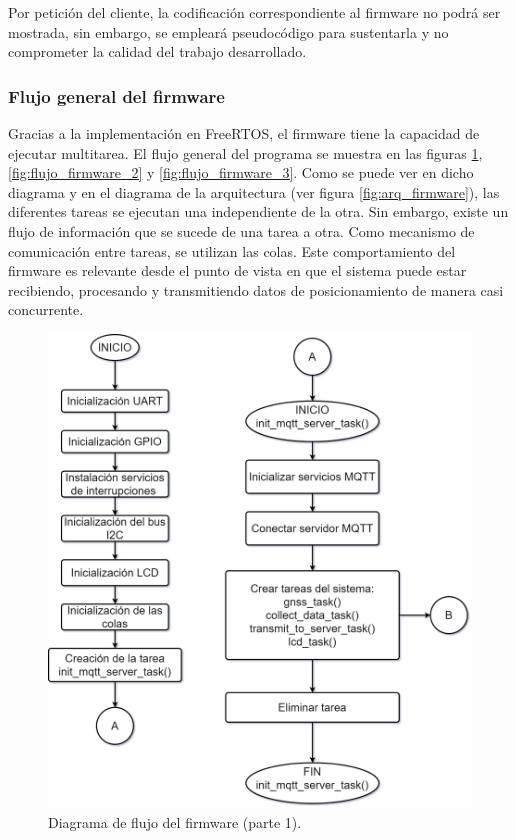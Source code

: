 Por petición del cliente, la codificación correspondiente al firmware no podrá ser mostrada, sin embargo, se empleará pseudocódigo para sustentarla y no comprometer la calidad del trabajo desarrollado. 

\subsubsection{Flujo general del firmware}

Gracias a la implementación en FreeRTOS, el firmware tiene la capacidad de ejecutar multitarea. El flujo general del programa se muestra en las figuras \ref{fig:flujo_firmware_1}, \ref{fig:flujo_firmware_2} y \ref{fig:flujo_firmware_3}. Como se puede ver en dicho diagrama y en el diagrama de la arquitectura (ver figura \ref{fig:arq_firmware}), las diferentes tareas se ejecutan una independiente de la otra. Sin embargo, existe un flujo de información que se sucede de una tarea a otra. Como mecanismo de comunicación entre tareas, se utilizan las colas. Este comportamiento del firmware es relevante desde el punto de vista en que el sistema puede estar recibiendo, procesando y transmitiendo datos de posicionamiento de manera casi concurrente. 

\begin{figure}
	\centering
	\includegraphics[width=.8\textwidth]{./Figures/Diagrama_flujo_firmware_TFE_CESE_Part_1.png}
	\caption{Diagrama de flujo del firmware (parte 1).}
	\label{fig:flujo_firmware_1}
\end{figure}

